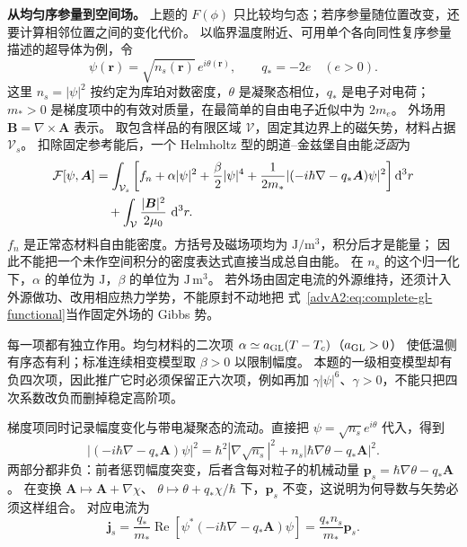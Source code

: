 \medskip\noindent\textbf{从均匀序参量到空间场。}
上题的 $F(\phi)$ 只比较均匀态；若序参量随位置改变，还要计算相邻位置之间的变化代价。
以临界温度附近、可用单个各向同性复序参量描述的超导体为例，令
\[
 \psi(\boldsymbol r)=\sqrt{n_s(\boldsymbol r)}\,e^{i\theta(\boldsymbol r)},
 \qquad q_*=-2e\quad(e>0).
\]
这里 $n_s=|\psi|^2$ 按约定为库珀对数密度，$\theta$ 是凝聚态相位，$q_*$ 是电子对电荷；
$m_*>0$ 是梯度项中的有效对质量，在最简单的自由电子近似中为 $2m_e$。
外场用 $\boldsymbol B=\nabla\times\boldsymbol A$ 表示。
取包含样品的有限区域 $\mathcal V$，固定其边界上的磁矢势，材料占据 $\mathcal V_s$。
扣除固定参考能后，一个 Helmholtz 型的朗道--金兹堡自由能\emph{泛函}为
\begin{align}
 \mathcal F[\psi,\boldsymbol A]
 &=\int_{\mathcal V_s}\left[
 f_n+\alpha|\psi|^2+\frac\beta2|\psi|^4
 +\frac1{2m_*}|(-i\hbar\nabla-q_*\boldsymbol A)\psi|^2
 \right]\dd^3r \notag\\
 &\quad+\int_{\mathcal V}\frac{|\boldsymbol B|^2}{2\mu_0}\,\dd^3r.
 \label{advA2:eq:complete-gl-functional}
\end{align}
$f_n$ 是正常态材料自由能密度。方括号及磁场项均为 $\mathrm{J/m^3}$，积分后才是能量；
因此不能把一个未作空间积分的密度表达式直接当成总自由能。
在 $n_s$ 的这个归一化下，$\alpha$ 的单位为 $\mathrm J$，$\beta$ 的单位为 $\mathrm{J\,m^3}$。
若外场由固定电流的外源维持，还须计入外源做功、改用相应热力学势，不能原封不动地把
式~\eqref{advA2:eq:complete-gl-functional}当作固定外场的 Gibbs 势。

每一项都有独立作用。均匀材料的二次项 $\alpha\simeq a_{\rm GL}(T-T_c)$（$a_{\rm GL}>0$）
使低温侧有序态有利；标准连续相变模型取 $\beta>0$ 以限制幅度。
本题的一级相变模型却有负四次项，因此推广它时必须保留正六次项，例如再加
$\gamma|\psi|^6$、$\gamma>0$，不能只把四次系数改负而删掉稳定高阶项。

梯度项同时记录幅度变化与带电凝聚态的流动。直接把 $\psi=\sqrt{n_s}e^{i\theta}$ 代入，得到
\[
 |(-i\hbar\nabla-q_*\boldsymbol A)\psi|^2
 =\hbar^2|\nabla\sqrt{n_s}|^2
 +n_s|\hbar\nabla\theta-q_*\boldsymbol A|^2.
\]
两部分都非负：前者惩罚幅度突变，后者含每对粒子的机械动量
$\boldsymbol p_s=\hbar\nabla\theta-q_*\boldsymbol A$。
在变换 $\boldsymbol A\mapsto\boldsymbol A+\nabla\chi$、
$\theta\mapsto\theta+q_*\chi/\hbar$ 下，$\boldsymbol p_s$ 不变，这说明为何导数与矢势必须这样组合。
对应电流为
\[
 \boldsymbol j_s=\frac{q_*}{m_*}\operatorname{Re}
 [\psi^*(-i\hbar\nabla-q_*\boldsymbol A)\psi]
 =\frac{q_*n_s}{m_*}\boldsymbol p_s.
\]

